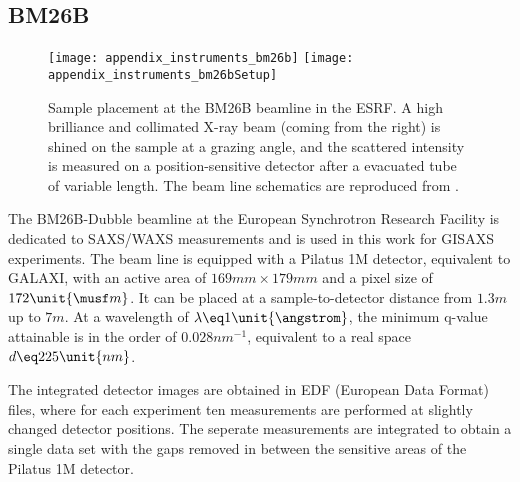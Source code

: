 \documentclass[\main/dresen_thesis.tex]{subfiles}
\begin{document}
  \subsection{BM26B}\label{ch:lss:BM26B}
    \begin{figure}[ht]
      \centering
      \texttt{[image: appendix\_instruments\_bm26b]}
      \texttt{[image: appendix\_instruments\_bm26bSetup]}
      \caption{\label{fig:lss:BM26B}Sample placement at the BM26B beamline in the ESRF. A high brilliance and collimated X-ray beam (coming from the right) is shined on the sample at a grazing angle, and the scattered intensity is measured on a position-sensitive detector after a evacuated tube of variable length. The beam line schematics are reproduced from \cite{Bras_2003_Recen}.}
    \end{figure}

    The BM26B-Dubble beamline at the European Synchrotron Research Facility is dedicated to SAXS/WAXS measurements and is used in this work for GISAXS experiments.
    The beam line is equipped with a Pilatus 1M detector, equivalent to GALAXI, with an active area of $169 \unit{mm} \times 179 \unit{mm}$ and a pixel size of $172 \unit{\musf m}$. 
    It can be placed at a sample-to-detector distance from $1.3 \unit{m}$ up to $7 \unit{m}$.
    At a wavelength of $\lambda \eq 1 \unit{\angstrom}$, the minimum q-value attainable is in the order of $0.028 \unit{nm^{-1}}$, equivalent to a real space $d \eq 225 \unit{nm}$.

    The integrated detector images are obtained in EDF (European Data Format) files, where for each experiment ten measurements are performed at slightly changed detector positions.
    The seperate measurements are integrated to obtain a single data set with the gaps removed in between the sensitive areas of the Pilatus 1M detector.
\end{document}
